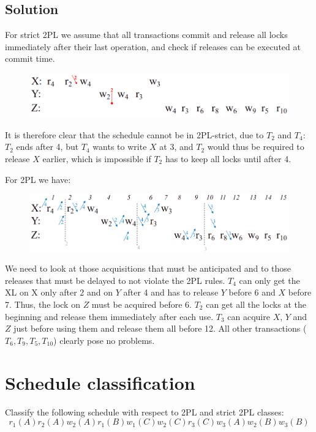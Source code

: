 \documentclass[12pt, a4paper]{report}
\newtheorem[style=M,bodystyle=\normalfont]{theorem}{Theorem}
\newtheorem[style=M,bodystyle=\normalfont]{corollary}{Corollary}
\newtheorem[style=M,bodystyle=\normalfont]{lemma}{Lemma}
\newtheorem[style=M,bodystyle=\normalfont]{definition}{Definition}
\begin{document}
    \subsection*{Solution}
        For strict 2PL we assume that all transactions commit and release all locks immediately after their last operation, and check if releases can be executed at commit time.
        \begin{figure}[H]
            \centering
            \includegraphics[width=1\linewidth]{images/2PL3.png}
        \end{figure}
        It is therefore clear that the schedule cannot be in 2PL-strict, due to $T_2$ and $T_4$: $T_2$ ends after 4, but $T_4$ wants to write $X$ at 3, and $T_2$ would thus be 
        required to release $X$ earlier, which is impossible if $T_2$ has to keep all locks until after 4.

        For 2PL we have: 
        \begin{figure}[H]
            \centering
            \includegraphics[width=1\linewidth]{images/2PL4.png}
        \end{figure}
        We need to look at those acquisitions that must be anticipated and to those releases that must be delayed to not violate the 2PL rules.
        $T_4$ can only get the XL on X only after 2 and on $Y$ after 4 and has to release $Y$ before 6 and $X$ before 7. Thus, the lock on $Z$ must be acquired before 6.
        $T_2$ can get all the locks at the beginning and release them immediately after each use. $T_3$ can acquire $X$, $Y$ and $Z$ just before using them and release them all before 12. 
        All other transactions ($T_6, T_9, T_5, T_10$) clearly pose no problems.

    \newpage

    \section{Schedule classification}
        Classify the following schedule with respect to 2PL and strict 2PL classes: 
        \[r_1(A) r_2(A) w_2(A) r_1(B) w_1(C) w_2(C) r_3(C) w_3(A) w_2(B) w_3(B)\]
\end{document}
